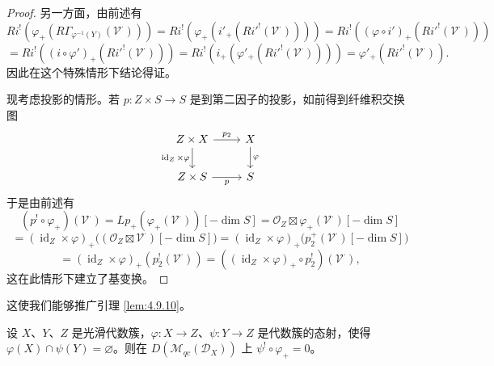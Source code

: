 \begin{proof}
另一方面，由前述有
$$Ri^!(\varphi_+(R\Gamma_{\varphi^{-1}(Y)}(\mathcal{V}^\cdot)))
=Ri^!(\varphi_+(i'_+(Ri'^!(\mathcal{V}^\cdot))))
=Ri^!((\varphi\circ i')_+(Ri'^!(\mathcal{V}^\cdot)))$$
$$=Ri^!((i\circ\varphi')_+(Ri'^!(\mathcal{V}^\cdot)))
=Ri^!(i_+(\varphi'_+(Ri'^!(\mathcal{V}^\cdot))))=\varphi'_+(Ri'^!(\mathcal{V}^\cdot)).$$
因此在这个特殊情形下结论得证。

现考虑投影的情形。若 $p:Z\times S\to S$ 是到第二因子的投影，如前得到纤维积交换图
$$\begin{tikzcd}
Z\times X \arrow[r,"p_2"] \arrow[d,"\operatorname{id}_Z\times\varphi"'] & X \arrow[d,"\varphi"]\\
Z\times S \arrow[r,"p"'] & S
\end{tikzcd}$$
于是由前述有
$$(p^!\circ\varphi_+)(\mathcal{V}^\cdot)=Lp_+(\varphi_+(\mathcal{V}^\cdot))[-\dim S]
=\mathcal{O}_Z\boxtimes\varphi_+(\mathcal{V}^\cdot)[-\dim S]$$
$$=(\operatorname{id}_Z\times\varphi)_+\bigl((\mathcal{O}_Z\boxtimes\mathcal{V}^\cdot)[-\dim S]\bigr)
=(\operatorname{id}_Z\times\varphi)_+\bigl(p_2^+(\mathcal{V}^\cdot)[-\dim S]\bigr)$$
$$=(\operatorname{id}_Z\times\varphi)_+(p_2^!(\mathcal{V}^\cdot))
=((\operatorname{id}_Z\times\varphi)_+\circ p_2^!)(\mathcal{V}^\cdot),$$
这在此情形下建立了基变换。
\end{proof}

这使我们能够推广引理 \ref{lem:4.9.10}。

\begin{corollary}\label{cor:4.10.3}
设 $X$、$Y$、$Z$ 是光滑代数簇，$\varphi:X\to Z$、$\psi:Y\to Z$ 是代数簇的态射，使得
$\varphi(X)\cap\psi(Y)=\varnothing$。则在 $D(\mathcal{M}_{qc}(\mathcal{D}_X))$ 上 $\psi^!\circ\varphi_+=0$。
\end{corollary}
